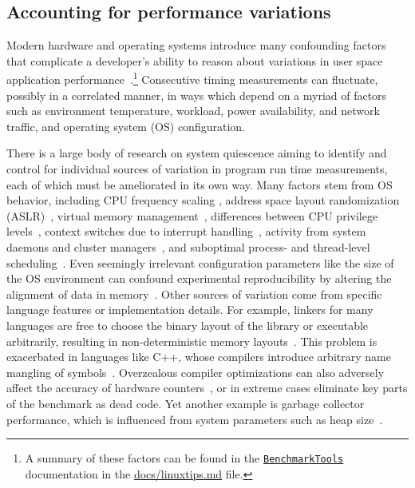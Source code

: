 \documentclass[conference]{IEEEtran}
\begin{document}
\subsection{Accounting for performance variations}
\label{sec:variations}

Modern hardware and operating systems introduce many confounding factors that complicate a
developer's ability to reason about variations in user space application
performance~\cite{HP5e}.\footnote{A summary of these factors can be found in the
\href{https://github.com/JuliaCI/BenchmarkTools.jl}{\lstinline|BenchmarkTools|}
documentation in the
\href{https://github.com/JuliaCI/BenchmarkTools.jl/blob/4db27210d43abf2c55226366f3a749afe1d64951/doc/linuxtips.md}{docs/linuxtips.md}
file.} Consecutive timing measurements can fluctuate, possibly in a correlated
manner, in ways which depend on a myriad of factors such as environment
temperature, workload, power availability, and network traffic, and operating
system (OS) configuration.

There is a large body of research on system quiescence aiming to identify and
control for individual sources of variation in program run time measurements,
each of which must be ameliorated in its own way. Many factors stem from OS
behavior, including CPU frequency scaling \cite{RHEL6}, address space layout
randomization (ASLR)~\cite{Shacham2004}, virtual memory
management~\cite{Oyama2014,Oyama2016}, differences between CPU privilege
levels~\cite{Zaparanuks2009}, context switches due to interrupt handling~\cite{Tsafrir2007},
activity from system daemons and cluster managers~\cite{Petrini2003}, and suboptimal
process- and thread-level scheduling~\cite{Lozi2016}. Even seemingly irrelevant
configuration parameters like the size of the OS environment can confound experimental
reproducibility by altering the alignment of data in memory~\cite{Mytkowicz2009}. Other
sources of variation come from specific language features or implementation details. For
example, linkers for many languages are free to choose the binary layout of the library or
executable arbitrarily, resulting in non-deterministic memory layouts~\cite{Georges2008}.
This problem is exacerbated in languages like C++, whose compilers introduce arbitrary name
mangling of symbols~\cite{Kalibera2005}. Overzealous compiler optimizations can also
adversely affect the accuracy of hardware counters~\cite{Zaparanuks2009}, or in extreme
cases eliminate key parts of the benchmark as dead code. Yet another example is garbage
collector performance, which is influenced from system parameters such as heap
size~\cite{Blackburn2004}.
\end{document}
